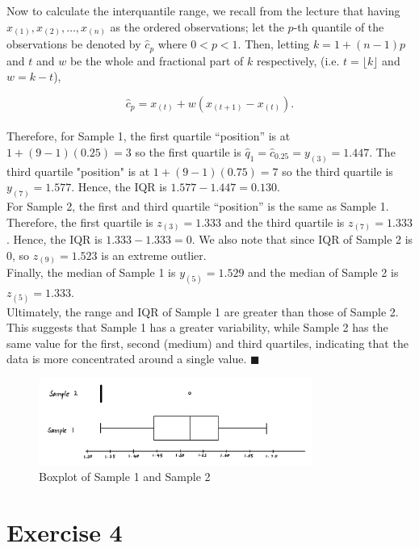 \documentclass{article}
\begin{document}
Now to calculate the interquantile range, we recall from the lecture that having $x_{(1)}, x_{(2)}, \dots, x_{(n)}$ as the ordered observations; let the $p$-th quantile of the observations be denoted by $\hat{c}_p$ where $0 < p < 1$. Then, letting $k = 1 + (n-1)p$ and $t$ and $w$ be the whole and fractional part of $k$ respectively, (i.e. $t = \lfloor k \rfloor$ and $w = k - t$),

$$
\hat{c}_p = x_{(t)} + w(x_{(t+1)} - x_{(t)}).
$$
\\
Therefore, for Sample 1, the first quartile ``position'' is at $1 + (9-1)(0.25) = 3$ so the first quartile is $\hat{q}_1 = \hat{c}_{0.25} = y_{(3)} = 1.447$. The third quartile "position" is at $1 + (9-1)(0.75) = 7$ so the third quartile is $y_{(7)} = 1.577$. Hence, the IQR is $1.577 - 1.447 = 0.130$. \\

For Sample 2, the first and third quartile ``position'' is the same as Sample 1. Therefore, the first quartile is $z_{(3)} = 1.333$ and the third quartile is $z_{(7)} = 1.333$. Hence, the IQR is $1.333 - 1.333 = 0$. We also note that since IQR of Sample 2 is 0, so $z_{(9)} = 1.523$ is an extreme outlier. \\

Finally, the median of Sample 1 is $y_{(5)} = 1.529$ and the median of Sample 2 is $z_{(5)} = 1.333$. \\



Ultimately, the range and IQR of Sample 1 are greater than those of Sample 2. This suggests that Sample 1 has a greater variability, while Sample 2 has the same value for the first, second (medium) and third quartiles, indicating that the data is more concentrated around a single value. $\blacksquare$

\begin{figure}[h!]
    \centering
    \includegraphics[width=0.8\textwidth]{images/boxplot.jpg}
    \caption{Boxplot of Sample 1 and Sample 2}
    \label{fig:boxplot}
\end{figure}

\newpage
\section*{Exercise 4}
\end{document}
